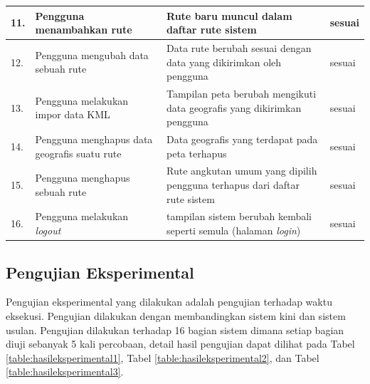 \begin{table}[H]
\begin{tabular}{|p{0.37cm}| p{3.5cm}| p{7cm}| p{2.5cm}|}
		11. & Pengguna menambahkan rute & Rute baru muncul dalam daftar rute sistem & sesuai \\ \hline
		12. & Pengguna mengubah data sebuah rute & Data rute berubah sesuai dengan data yang dikirimkan oleh pengguna & sesuai  \\ \hline
		13. & Pengguna melakukan impor data KML & Tampilan peta berubah mengikuti data geografis yang dikirimkan pengguna & sesuai \\ \hline
		14. & Pengguna menghapus data geografis suatu rute & Data geografis yang terdapat pada peta terhapus & sesuai \\ \hline
		15. & Pengguna menghapus sebuah rute & Rute angkutan umum yang dipilih pengguna terhapus dari daftar rute sistem & sesuai  \\ \hline
		16. & Pengguna melakukan \textit{logout} & tampilan sistem berubah kembali seperti semula (halaman \textit{login}) & sesuai  \\ \hline
		\end{tabular}
	\label{table:hasilfungsional}
\end{table}

\subsection{Pengujian Eksperimental}
\label{sec:pengujianeksperimental}
Pengujian eksperimental yang dilakukan adalah pengujian terhadap waktu eksekusi. Pengujian dilakukan dengan membandingkan sistem kini dan sistem usulan. Pengujian dilakukan terhadap 16 bagian sistem dimana setiap bagian diuji sebanyak 5 kali percobaan, detail hasil pengujian dapat dilihat pada Tabel \ref{table:hasileksperimental1}, Tabel \ref{table:hasileksperimental2}, dan Tabel \ref{table:hasileksperimental3}.


